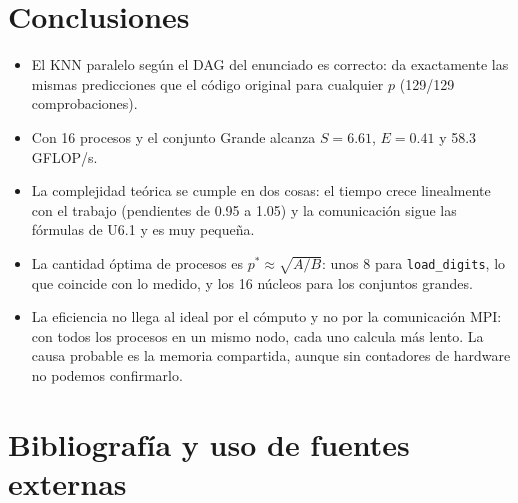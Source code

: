 \documentclass[11pt,a4paper]{article}
\begin{document}
\section{Conclusiones}
\begin{itemize}
\item El KNN paralelo según el DAG del enunciado es correcto: da exactamente las mismas predicciones que el código original para cualquier $p$ (129/129 comprobaciones).
\item Con 16 procesos y el conjunto Grande alcanza $S=6.61$, $E=0.41$ y 58.3\,GFLOP/s.
\item La complejidad teórica se cumple en dos cosas: el tiempo crece linealmente con el trabajo (pendientes de 0.95 a 1.05) y la comunicación sigue las fórmulas de U6.1 y es muy pequeña.
\item La cantidad óptima de procesos es $p^*\approx\sqrt{A/B}$: unos 8 para \texttt{load\_digits}, lo que coincide con lo medido, y los 16 núcleos para los conjuntos grandes.
\item La eficiencia no llega al ideal por el cómputo y no por la comunicación MPI: con todos los procesos en un mismo nodo, cada uno calcula más lento. La causa probable es la memoria compartida, aunque sin contadores de hardware no podemos confirmarlo.
\end{itemize}

\section{Bibliografía y uso de fuentes externas}
\end{document}

